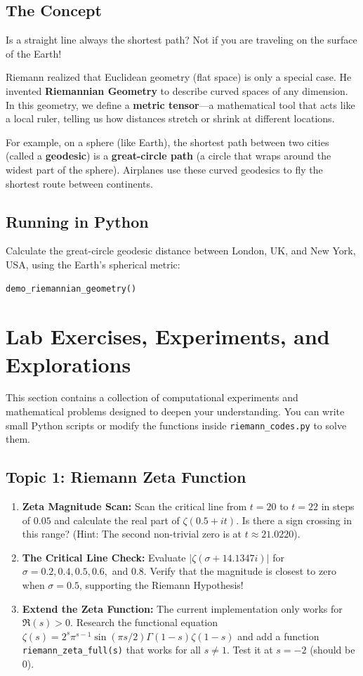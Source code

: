 \documentclass[11pt]{article}
\begin{document}
\subsection{The Concept}
Is a straight line always the shortest path? Not if you are traveling on the surface of the Earth!

Riemann realized that Euclidean geometry (flat space) is only a special case. He invented \textbf{Riemannian Geometry} to describe curved spaces of any dimension. In this geometry, we define a \textbf{metric tensor}---a mathematical tool that acts like a local ruler, telling us how distances stretch or shrink at different locations.

For example, on a sphere (like Earth), the shortest path between two cities (called a \textbf{geodesic}) is a \textbf{great-circle path} (a circle that wraps around the widest part of the sphere). Airplanes use these curved geodesics to fly the shortest route between continents.

\subsection{Running in Python}
Calculate the great-circle geodesic distance between London, UK, and New York, USA, using the Earth's spherical metric:
\begin{lstlisting}
demo_riemannian_geometry()
\end{lstlisting}

\section{Lab Exercises, Experiments, and Explorations}

This section contains a collection of computational experiments and mathematical problems designed to deepen your understanding. You can write small Python scripts or modify the functions inside \texttt{riemann\_codes.py} to solve them.

\subsection{Topic 1: Riemann Zeta Function}
\begin{enumerate}
    \item \textbf{Zeta Magnitude Scan:} Scan the critical line from $t=20$ to $t=22$ in steps of $0.05$ and calculate the real part of $\zeta(0.5 + it)$. Is there a sign crossing in this range? (Hint: The second non-trivial zero is at $t \approx 21.0220$).
    \item \textbf{The Critical Line Check:} Evaluate $|\zeta(\sigma + 14.1347i)|$ for $\sigma = 0.2, 0.4, 0.5, 0.6,$ and $0.8$. Verify that the magnitude is closest to zero when $\sigma = 0.5$, supporting the Riemann Hypothesis!
    \item \textbf{Extend the Zeta Function:} The current implementation only works for $\Re(s) > 0$. Research the functional equation $\zeta(s) = 2^s \pi^{s-1} \sin(\pi s/2) \Gamma(1-s) \zeta(1-s)$ and add a function \texttt{riemann\_zeta\_full(s)} that works for all $s \neq 1$. Test it at $s=-2$ (should be 0).
\end{enumerate}
\end{document}
